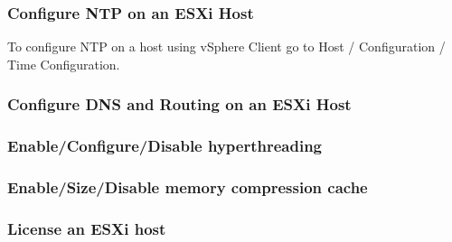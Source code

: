 \subsubsection{Configure NTP on an ESXi Host}

To configure NTP on a host using vSphere Client go to Host / Configuration /
Time Configuration.

\subsubsection{Configure DNS and Routing on an ESXi Host}

\subsubsection{Enable/Configure/Disable hyperthreading}

\subsubsection{Enable/Size/Disable memory compression cache}

\subsubsection{License an ESXi host}
